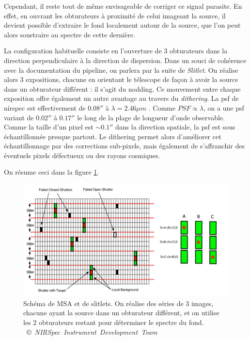 \documentclass[11pt, a4paper]{article}
\newcommand{\customcite}[2]{\mbox{
  {\small \copyright} \textit{#1} \cite{#2}}
}
\begin{document}
Cependant, il reste tout de même envisageable de corriger ce signal parasite. En effet, en ouvrant les obturateurs à proximité de celui imageant la source, il devient possible d'extraire le fond localement autour de la source, que l'on peut alors soustraire au spectre de cette dernière.

La configuration habituelle consiste en l'ouverture de 3 obturateurs dans la direction perpendiculaire à la direction de dispersion. Dans un souci de cohérence avec la documentation du pipeline, on parlera par la suite de \textit{Slitlet}. On réalise alors 3 expositions, chacune en orientant le télescope de façon à avoir la source dans un obturateur différent : il s'agit du nodding. Ce mouvement entre chaque exposition offre également un autre avantage au travers du \textit{dithering}. La \gls{psf} de \gls{nirspec} est effectivement de $0.08 ''$ à $\lambda = 2.46 \mu m$ \cite{10_1051_0004_6361_202142663}. 
Comme $PSF \propto \lambda$, on a une \gls{psf} variant de $0.02 ''$ à $0.17''$ le long de la plage de longueur d'onde observable. Comme la taille d'un pixel est $\sim 0.1''$ dans la direction spatiale, la \gls{psf} est sous échantillonnée presque partout. Le dithering permet alors d'améliorer cet échantillonnage par des corrections sub-pixels, mais également de s'affranchir des éventuels pixels défectueux ou des rayons cosmiques.

On résume ceci dans la figure \ref{fig:msa_slitlet}.


\begin{figure}[H]
  \centering
  \includegraphics[scale=0.2]{assets/MSA_sky_strategy.png}
  \caption{Schéma de MSA et de slitlets. On réalise des séries de 3 images, chacune ayant la source dans un obturateur différent, et on utilise les 2 obturateurs restant pour déterminer le spectre du fond. \customcite{NIRSpec Instrument Development Team}{mos}}
  \label{fig:msa_slitlet}
\end{figure}
\end{document}
